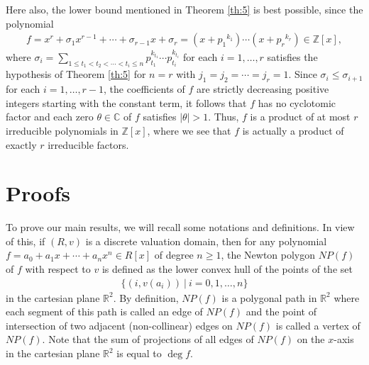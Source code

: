 \documentclass[12pt]{amsart}%
\begin{document}
\begin{remark}
Here also, the lower bound mentioned in Theorem \ref{th:5} is best possible, since the polynomial
\begin{eqnarray*}
f=x^r+\sigma_1 x^{r-1}+\cdots+\sigma_{r-1}x+\sigma_r=(x+{p_1}^{k_1})\cdots (x+{p_r}^{k_r})\in \mathbb{Z}[x],
\end{eqnarray*}
where $\sigma_i=\sum_{1\leq t_1<t_2<\cdots<t_{i}\leq n}p_{t_1}^{k_{t_1}}\cdots p_{t_i}^{k_{t_i}}$ for each $i=1,\ldots, r$ satisfies the hypothesis of Theorem \ref{th:5} for $n=r$ with  $j_1=j_2=\cdots=j_r=1$. Since $\sigma_i\leq \sigma_{i+1}$ for each $i=1,\ldots, r-1$, the coefficients of $f$ are strictly decreasing positive integers starting with the constant term, it follows that  $f$ has no cyclotomic factor and each zero $\theta\in \mathbb{C}$ of $f$ satisfies $|\theta|>1$. Thus, $f$ is a product of at most $r$ irreducible polynomials in $\mathbb{Z}[x]$, where we see that $f$ is actually a product  of exactly $r$ irreducible factors.
\end{remark}
\section{Proofs}\label{sec:2}
To prove our main results, we will recall some notations and definitions. In view of this, if $(R,v)$ is a discrete valuation domain, then for any polynomial $f=a_0+a_1x+\cdots+a_nx^n \in R[x]$ of degree $n\geq 1$, the Newton polygon $NP(f)$ of $f$ with respect to $v$ is defined as the lower convex hull of the points of the set
\begin{eqnarray*}
\{(i,v(a_i))~|~i=0,1,\ldots, n\}
\end{eqnarray*}
in the cartesian plane $\mathbb{R}^2$. By definition, $NP(f)$ is a polygonal path in $\mathbb{R}^2$ where each segment of this path is called an edge of $NP(f)$ and the point of intersection of two adjacent (non-collinear) edges on $NP(f)$ is called a vertex of $NP(f)$. Note that the sum of projections of all edges of $NP(f)$ on the $x$-axis in the cartesian plane $\mathbb{R}^2$ is equal to $\deg f$.
\end{document}
